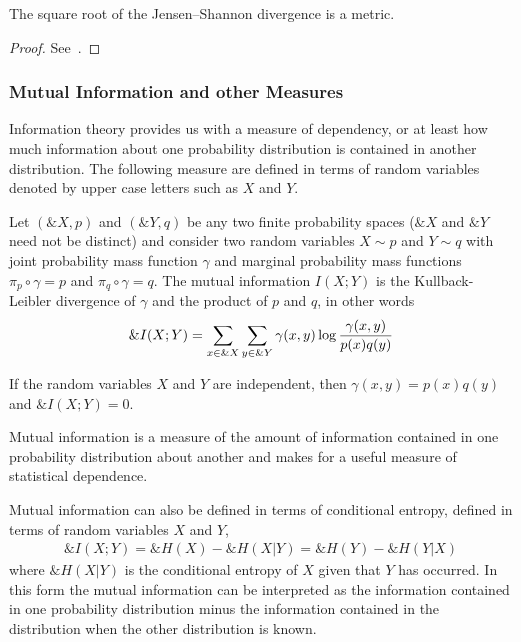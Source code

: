 \begin{theorem}
  The square root of the Jensen–Shannon divergence is a metric.
\end{theorem}
\begin{proof}
  See~\cite{ref:endres-2003}.
\end{proof}

\subsubsection*{Mutual Information and other Measures}

Information theory provides us with a measure of dependency, or at least how
much information about one probability distribution is contained in another
distribution. The following measure are defined in terms of random variables
denoted by upper case letters such as $X$ and $Y$.

\begin{definition}
  Let $(\&X, p)$ and $(\&Y, q)$ be any two finite probability spaces ($\&X$ and
  $\&Y$ need not be distinct) and consider two random variables $X \sim p$ and
  $Y \sim q$ with joint probability mass function $\gamma$ and marginal
  probability mass functions $\pi_p \circ \gamma = p$ and $\pi_q \circ \gamma =
  q$. The \textnormal{\sffamily mutual information} $I(X;Y)$ is the
  Kullback-Leibler divergence of $\gamma$ and the product of $p$ and $q$, in
  other words
  \begin{align}
    \label{eq:mutual-information}
    \&I(X; Y) = \sum_{x \in \&X}\sum_{y \in \&Y}\gamma(x, y) \log{{\gamma(x, y) \over p(x)q(y)}}
  \end{align}
\end{definition}

\begin{theorem}
  If the random variables $X$ and $Y$ are independent, then $\gamma(x,y) =
  p(x)q(y)$ and $\&I(X; Y) = 0$.
\end{theorem}

\begin{remark}
  Mutual information is a measure of the amount of information contained in one
  probability distribution about another and makes for a useful measure of
  statistical dependence.
\end{remark}

\begin{remark}
  Mutual information can also be defined in terms of conditional entropy,
  defined in terms of random variables $X$ and $Y$,
  \begin{align}
    \label{eq:mutual-information-alt}
    \&I(X; Y) = \&H(X) - \&H(X | Y) = \&H(Y) - \&H(Y | X)
  \end{align}
  where $\&H(X | Y)$ is the conditional entropy of $X$ given that $Y$ has
  occurred. In this form the mutual information can be interpreted as the
  information contained in one probability distribution minus the information
  contained in the distribution when the other distribution is known.
  \end{remark}

